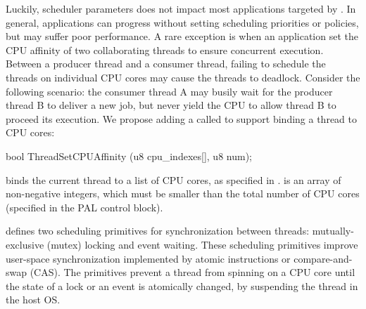 Luckily, scheduler parameters does not impact most applications targeted by \graphene{}.
In general, applications can progress without setting scheduling priorities or policies, but may suffer poor performance.
A rare exception is when
an application set the CPU affinity of two collaborating threads to ensure concurrent execution.
Between a producer thread and a consumer thread,
failing to schedule the threads on individual CPU cores may cause the threads to deadlock.
Consider the following scenario:
the consumer thread A may busily wait for the producer thread B to deliver a new job, but never yield the CPU to allow thread B to proceed its execution.
We propose adding a \hostapi{} called 
to support binding a thread to CPU cores:

\begin{paldef}
bool ThreadSetCPUAffinity (u8 cpu_indexes[], u8 num);
\end{paldef}

 binds the current thread to a list of CPU cores, as specified in .
 is an array of non-negative integers, which must be smaller than the total number of CPU cores (specified in the PAL control block).





\Thehostabi{} defines two scheduling primitives for synchronization between threads: mutually-exclusive (mutex) locking and event waiting.
These scheduling primitives improve user-space synchronization
implemented by atomic instructions or compare-and-swap (CAS).
The primitives prevent a thread from spinning on a CPU core
until the state of a lock or an event
is atomically changed,
by suspending the thread in the host OS.





